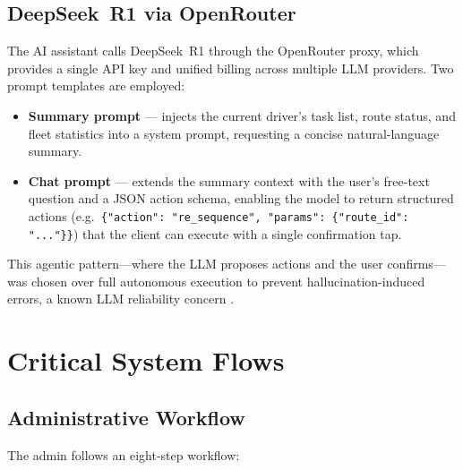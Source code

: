 \subsection{DeepSeek~R1 via OpenRouter}
\label{sec:deepseek}

The AI assistant calls DeepSeek~R1 through the OpenRouter proxy, which
provides a single API key and unified billing across multiple LLM providers.
Two prompt templates are employed:

\begin{itemize}
  \item \textbf{Summary prompt} — injects the current driver's task list,
        route status, and fleet statistics into a system prompt, requesting a
        concise natural-language summary.
  \item \textbf{Chat prompt} — extends the summary context with the user's
        free-text question and a JSON action schema, enabling the model to
        return structured actions (e.g.\ \texttt{\{"action": "re\_sequence",
        "params": \{"route\_id": "..."\}\}}) that the client can execute with
        a single confirmation tap.
\end{itemize}

This agentic pattern—where the LLM proposes actions and the user confirms—was
chosen over full autonomous execution to prevent hallucination-induced errors,
a known LLM reliability concern \autocite{ji2024hallucination}.

\section{Critical System Flows}
\label{sec:flows}

\subsection{Administrative Workflow}
\label{sec:admin-flow}

The admin follows an eight-step workflow:


